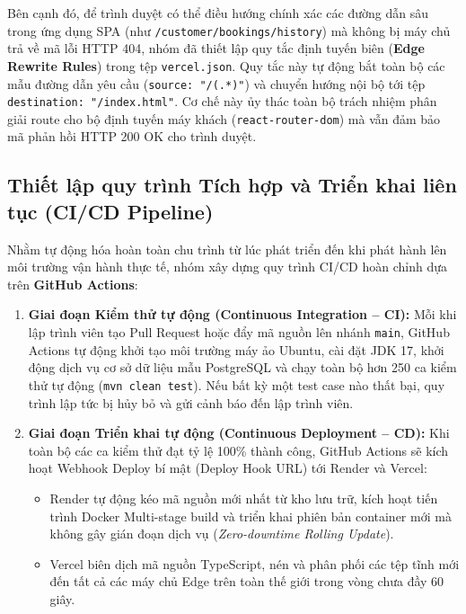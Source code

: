 Bên cạnh đó, để trình duyệt có thể điều hướng chính xác các đường dẫn sâu trong ứng dụng SPA (như \texttt{/customer/bookings/history}) mà không bị máy chủ trả về mã lỗi HTTP 404, nhóm đã thiết lập quy tắc định tuyến biên (\textbf{Edge Rewrite Rules}) trong tệp \texttt{vercel.json}. Quy tắc này tự động bắt toàn bộ các mẫu đường dẫn yêu cầu (\texttt{source: "/(.*)"}) và chuyển hướng nội bộ tới tệp \texttt{destination: "/index.html"}. Cơ chế này ủy thác toàn bộ trách nhiệm phân giải route cho bộ định tuyến máy khách (\texttt{react-router-dom}) mà vẫn đảm bảo mã phản hồi HTTP 200 OK cho trình duyệt.

\subsection{Thiết lập quy trình Tích hợp và Triển khai liên tục (CI/CD Pipeline)}

Nhằm tự động hóa hoàn toàn chu trình từ lúc phát triển đến khi phát hành lên môi trường vận hành thực tế, nhóm xây dựng quy trình CI/CD hoàn chỉnh dựa trên \textbf{GitHub Actions}:

\begin{enumerate}
    \item \textbf{Giai đoạn Kiểm thử tự động (Continuous Integration -- CI):} Mỗi khi lập trình viên tạo Pull Request hoặc đẩy mã nguồn lên nhánh \texttt{main}, GitHub Actions tự động khởi tạo môi trường máy ảo Ubuntu, cài đặt JDK 17, khởi động dịch vụ cơ sở dữ liệu mẫu PostgreSQL và chạy toàn bộ hơn 250 ca kiểm thử tự động (\texttt{mvn clean test}). Nếu bất kỳ một test case nào thất bại, quy trình lập tức bị hủy bỏ và gửi cảnh báo đến lập trình viên.
    \item \textbf{Giai đoạn Triển khai tự động (Continuous Deployment -- CD):} Khi toàn bộ các ca kiểm thử đạt tỷ lệ 100\% thành công, GitHub Actions sẽ kích hoạt Webhook Deploy bí mật (Deploy Hook URL) tới Render và Vercel:
    \begin{itemize}
        \item Render tự động kéo mã nguồn mới nhất từ kho lưu trữ, kích hoạt tiến trình Docker Multi-stage build và triển khai phiên bản container mới mà không gây gián đoạn dịch vụ (\textit{Zero-downtime Rolling Update}).
        \item Vercel biên dịch mã nguồn TypeScript, nén và phân phối các tệp tĩnh mới đến tất cả các máy chủ Edge trên toàn thế giới trong vòng chưa đầy 60 giây.
    \end{itemize}
\end{enumerate}

